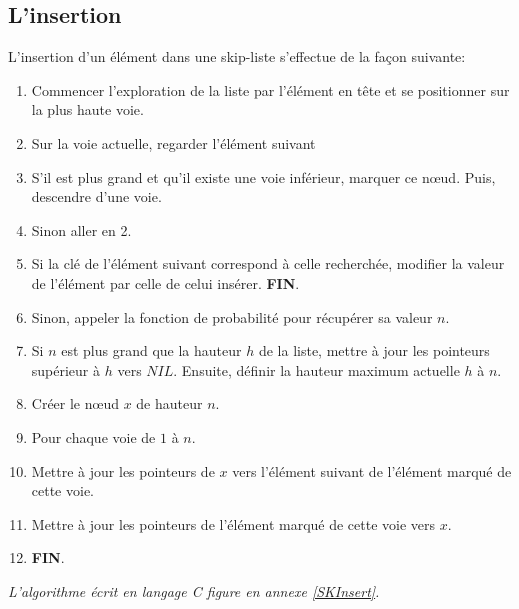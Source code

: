 \documentclass[hidelinks,a4paper, 12pt]{article}
\begin{document}
	\subsection{L'insertion}
	L'insertion d'un élément dans une skip-liste s'effectue de la façon suivante:
	\begin{enumerate}
		\item Commencer l'exploration de la liste par l'élément en tête et se positionner sur la plus haute voie.
		\item Sur la voie actuelle, regarder l'élément suivant
		\item S'il est plus grand et qu'il existe une voie inférieur, marquer ce nœud. Puis, descendre d'une voie.
		\item Sinon aller en 2.
		\item Si la clé de l'élément suivant correspond à celle recherchée, modifier la valeur de l'élément par celle de celui insérer. \textbf{FIN}.
		\item Sinon, appeler la fonction de probabilité pour récupérer sa valeur $n$.
		\item Si $n$ est plus grand que la hauteur $h$ de la liste, mettre à jour les pointeurs supérieur à $h$ vers $NIL$. Ensuite, définir la hauteur maximum actuelle $h$ à $n$.
		\item Créer le nœud $x$ de hauteur $n$.
		\item Pour chaque voie de $1$ à $n$.
		\item Mettre à jour les pointeurs de $x$ vers l'élément suivant de l'élément marqué de cette voie.
		\item Mettre à jour les pointeurs de l'élément marqué de cette voie vers $x$.
		\item \textbf{FIN}.
	\end{enumerate}
	\emph{L'algorithme écrit en langage C figure en annexe \ref{SKInsert}.}
	
	
\end{document}

